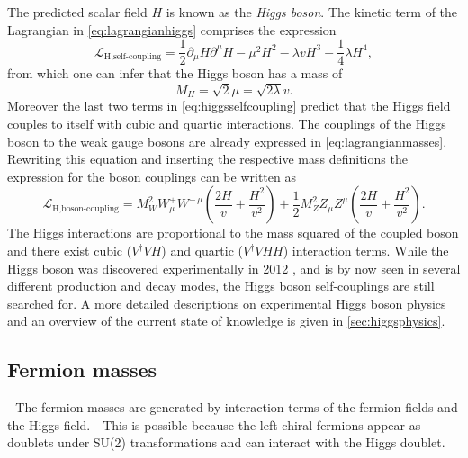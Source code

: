 The predicted scalar field $H$ is known as the \emph{Higgs boson}.
The kinetic term of the Lagrangian in \cref{eq:lagrangianhiggs} comprises the expression
\begin{equation}
  \mathcal{L}_{\text{H,self-coupling}} = \frac{1}{2}\partial_\mu H \partial^\mu H - \mu^2 H^2 - \lambda v H^3 - \frac{1}{4} \lambda H^4,
  \label{eq:higgsselfcoupling}
\end{equation}
from which one can infer that the Higgs boson has a mass of
\begin{equation}
  M_H = \sqrt{2} \mu = \sqrt{2 \lambda} v.
\end{equation}
Moreover the last two terms in \cref{eq:higgsselfcoupling} predict that the Higgs field couples to itself with cubic and quartic interactions.
The couplings of the Higgs boson to the weak gauge bosons are already expressed in \cref{eq:lagrangianmasses}. Rewriting this equation and inserting the respective mass definitions the expression for the boson couplings can be written as
\begin{equation}
  \mathcal{L}_{\text{H,boson-coupling}} = M_W^2 W_\mu^+W^{-\,\mu} \left( \frac{2H}{v} + \frac{H^2}{v^2} \right) + \frac{1}{2} M_Z^2 Z_\mu Z^\mu \left( \frac{2H}{v} + \frac{H^2}{v^2} \right).
  \label{eq:higgsbosoncoupling}
\end{equation}
The Higgs interactions are proportional to the mass squared of the coupled boson and there exist cubic ($V^\dagger VH$) and quartic ($V^\dagger VHH$) interaction terms.
While the Higgs boson was discovered experimentally in 2012 \cite{Aad:2012tfa,Chatrchyan:2012xdj}, and is by now seen in several different production and decay modes, the Higgs boson self-couplings are still searched for.
A more detailed descriptions on experimental Higgs boson physics and an overview of the current state of knowledge is given in \cref{sec:higgsphysics}.












\subsection{Fermion masses}
- The fermion masses are generated by interaction terms of the fermion fields and the Higgs field.
- This is possible because the left-chiral fermions appear as doublets under SU(2) transformations and can interact with the Higgs doublet.


